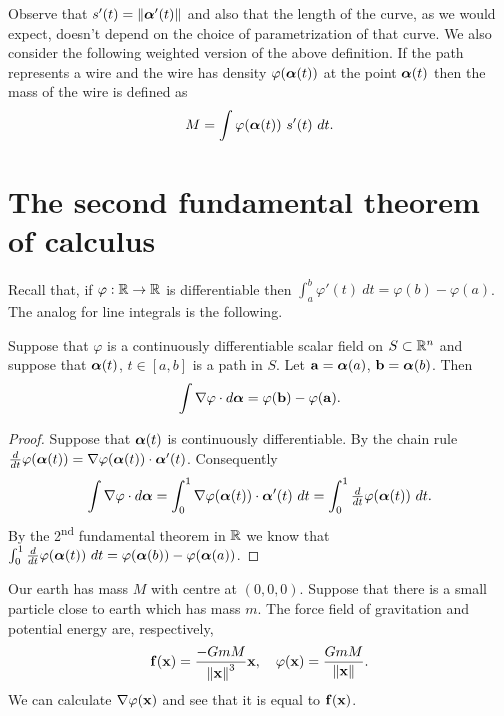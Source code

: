 Observe that \(s'(t) = \left\|\boldsymbol{\alpha}'(t)\right\| \) and also that the length of the curve, as we would expect, doesn't depend on the choice of parametrization of that curve.
We also consider the following weighted version of the above definition.
If the path represents a wire and the wire has density \(\varphi(\boldsymbol{\alpha}(t))\) at the point \(\boldsymbol{\alpha}(t)\) then the mass of the wire is defined as
\[
    M = \displaystyle\int \varphi(\boldsymbol{\alpha}(t)) \ s'(t) \ dt.
\]

\section{The second fundamental theorem of calculus}

Recall that, if \(\varphi:\mathbb{R} \to \mathbb{R}\) is differentiable then
\(\int_a^b \varphi'(t) \ dt = \varphi(b) - \varphi(a)\).
The analog for line integrals is the following.

\begin{theorem}
    Suppose that \(\varphi\) is a continuously differentiable scalar field on \(S \subset \mathbb{R}^n\)
    and suppose that \(\boldsymbol{\alpha}(t)\), \(t\in[a,b]\) is a path in \(S\).
    Let \(\mathbf{a} = \boldsymbol{\alpha}(a)\),  \(\mathbf{b} = \boldsymbol{\alpha}(b)\).
    Then
    \[
        \int \nabla \varphi \cdot d\boldsymbol{\alpha} = \varphi(\mathbf{b}) - \varphi(\mathbf{a}).
    \]
\end{theorem}

\begin{proof}
    Suppose that \(\boldsymbol{\alpha}(t)\) is continuously differentiable.
    By the chain rule \(\frac{d}{dt} \varphi(\boldsymbol{\alpha}(t)) = \nabla \varphi(\boldsymbol{\alpha}(t))\cdot \boldsymbol{\alpha}'(t)\).
    Consequently
    \[
        \int \nabla \varphi \cdot d\boldsymbol{\alpha}
        = \int_0^1 \nabla \varphi(\boldsymbol{\alpha}(t)) \cdot \boldsymbol{\alpha}'(t)\ dt
        = \int_0^1 \tfrac{d}{dt} \varphi(\boldsymbol{\alpha}(t)) \ dt.
    \]
    By the 2\textsuperscript{nd} fundamental theorem in \(\mathbb{R}\) we know that
    \(\int_0^1 \tfrac{d}{dt} \varphi(\boldsymbol{\alpha}(t)) \ dt = \varphi(\boldsymbol{\alpha}(b)) - \varphi(\boldsymbol{\alpha}(a))\).
\end{proof}

\begin{example}
    Our earth has mass \(M\) with centre at \((0,0,0)\).
    Suppose that there is a small particle close to earth which has mass \(m\).
    The force field of gravitation and potential energy are, respectively,
    \[
        \mathbf{f}(\mathbf{x}) = \frac{-GmM}{\left\|\mathbf{x}\right\|^3}\mathbf{x},
        \quad
        \varphi(\mathbf{x}) = \frac{GmM}{\left\|\mathbf{x}\right\|}.
    \]
    We can calculate \(\nabla \varphi(\mathbf{x})\) and see that it is equal to \(\mathbf{f}(\mathbf{x})\).
\end{example}



